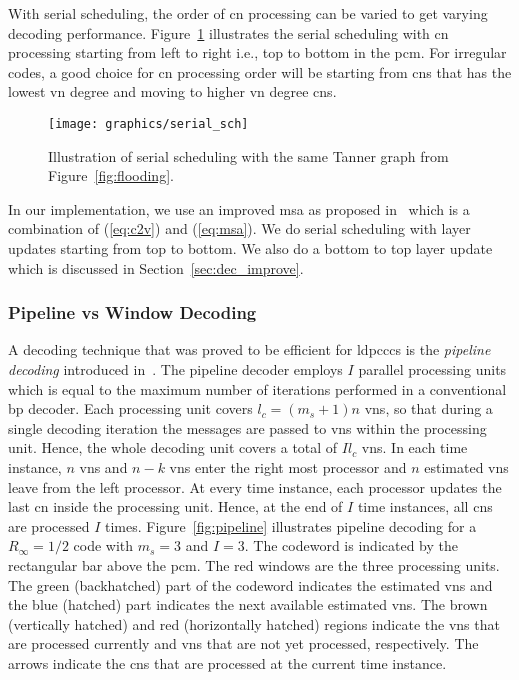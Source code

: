 With serial scheduling, the order of \ac{cn} processing can be varied to get varying decoding performance. Figure~\ref{fig:serial_sch} illustrates the serial scheduling with \ac{cn} processing starting from left to right i.e., top to bottom in the \ac{pcm}. For irregular codes, a good choice for \ac{cn} processing order will be starting from \acp{cn} that has the lowest \ac{vn} degree and moving to higher \ac{vn} degree \acp{cn}.

\begin{figure}[htbp]
  \centering
  \texttt{[image: graphics/serial\_sch]}
  \caption{Illustration of serial scheduling with the same Tanner graph from Figure~\ref{fig:flooding}.}
  \label{fig:serial_sch}
\end{figure}

In our implementation, we use an improved \ac{msa} as proposed in~\cite{Jones2003} which is a combination of (\ref{eq:c2v}) and (\ref{eq:msa}). We do serial scheduling with layer updates starting from top to bottom. We also do a bottom to top layer update which is discussed in Section~\ref{sec:dec_improve}.

\subsubsection{Pipeline vs Window Decoding}\label{sec:back_wd}
A decoding technique that was proved to be efficient for \acp{ldpccc} is the \emph{pipeline decoding} introduced in~\cite{Felstrom1999}. The pipeline decoder employs $I$ parallel processing units which is equal to the maximum number of iterations performed in a conventional \ac{bp} decoder. Each processing unit covers $l_c=(m_s+1)n$ \acp{vn}, so that during a single decoding iteration the messages are passed to \acp{vn} within the processing unit. Hence, the whole decoding unit covers a total of $Il_c$ \acp{vn}. In each time instance, $n$ \acp{vn} and $n-k$ \acp{vn} enter the right most processor and $n$ estimated \acp{vn} leave from the left processor. At every time instance, each processor updates the last \ac{cn} inside the processing unit. Hence, at the end of $I$ time instances, all \acp{cn} are processed $I$ times. Figure~\ref{fig:pipeline} illustrates pipeline decoding for a $R_\infty=1/2$ code with $m_s=3$ and $I=3$. The codeword is indicated by the rectangular bar above the \ac{pcm}. The red windows are the three processing units. The green (backhatched) part of the codeword indicates the estimated \acp{vn} and the blue (hatched) part indicates the next available estimated \acp{vn}. The brown (vertically hatched) and red (horizontally hatched) regions indicate the \acp{vn} that are processed currently and \acp{vn} that are not yet processed, respectively. The arrows indicate the \acp{cn} that are processed at the current time instance.

